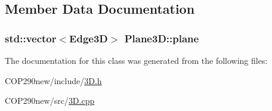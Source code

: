\subsection{Member Data Documentation}
\subsubsection[{\texorpdfstring{plane}{plane}}]{\setlength{\rightskip}{0pt plus 5cm}std\+::vector$<${\bf Edge3D}$>$ Plane3\+D\+::plane}\hypertarget{class_plane3_d_aff30a0d398845f7141692fa5d7493280}{}\label{class_plane3_d_aff30a0d398845f7141692fa5d7493280}


The documentation for this class was generated from the following files\+:\begin{DoxyCompactItemize}
\item 
C\+O\+P290new/include/\hyperlink{3_d_8h}{3\+D.\+h}\item 
C\+O\+P290new/src/\hyperlink{3_d_8cpp}{3\+D.\+cpp}\end{DoxyCompactItemize}
